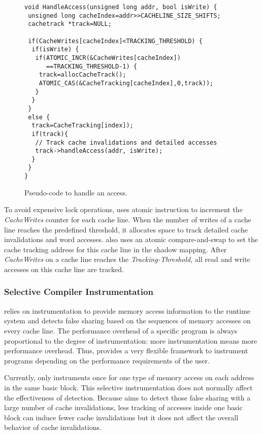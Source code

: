 \begin{figure}[!t]
\begin{lstlisting}
void HandleAccess(unsigned long addr, bool isWrite) {
 unsigned long cacheIndex=addr>>CACHELINE_SIZE_SHIFTS;
 cachetrack *track=NULL;

 if(CacheWrites[cacheIndex]<TRACKING_THRESHOLD) {
  if(isWrite) {
   if(ATOMIC_INCR(&CacheWrites[cacheIndex]) 
      ==TRACKING_THRESHOLD-1) {
    track=allocCacheTrack();
    ATOMIC_CAS(&CacheTracking[cacheIndex],0,track));
   }
  } 
 }
 else {
  track=CacheTracking[index]);
  if(track){
   // Track cache invalidations and detailed accesses
   track->handleAccess(addr, isWrite);
  }
 }
}
\end{lstlisting}
\caption{Pseudo-code to handle an access.\label{fig:algorithm}}
\end{figure}

To avoid expensive lock operations, \Predator{} uses atomic instruction to increment 
the {\it CacheWrites} counter for each cache line. 
When the number of writes of a cache line reaches the predefined threshold,
it allocates space to track detailed cache invalidations and word accesses.
\Predator{} also 
uses an atomic compare-and-swap to set the cache tracking address for this cache line in
the shadow mapping.
After {\it CacheWrites} on a cache line reaches the {\it Tracking-Threshold}, 
all read and write accesses on this cache line are tracked.


\subsubsection{Selective Compiler Instrumentation}

\Predator{} relies on instrumentation to provide memory access information to the runtime system 
and detects false sharing based on the sequences of memory accesses on every cache line. 
The performance overhead of a specific program is always proportional to 
the degree of instrumentation: more 
instrumentation means more performance overhead. 
Thus, \Predator{} provides a very flexible framework to instrument programs 
depending on the performance requirements of the user.

Currently, \Predator{} only instruments once for one type of memory access on each address 
in the same basic block. 
This selective instrumentation does not normally affect the effectiveness of detection. 
Because \Predator{} aims to detect those false sharing with a large number of cache invalidations,
less tracking of accesses inside one basic block can induce fewer cache invalidations 
but it does not affect the overall behavior of cache invalidations. 


